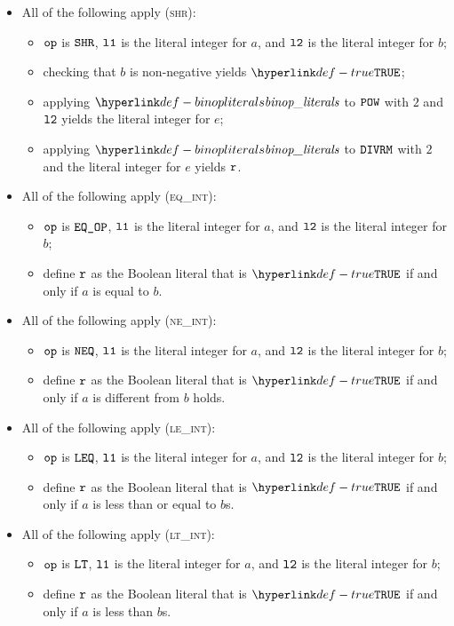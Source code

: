 \documentclass{book}
\newcommand\ProseOrTypeError[0]{\ProseTerminateAs{\TypeErrorConfig}}
\begin{document}
\begin{itemize}
  \item All of the following apply (\textsc{shr}):
  \begin{itemize}
    \item $\texttt{op}$ is $\texttt{SHR}$, $\texttt{l1}$ is the literal integer for $a$, and $\texttt{l2}$ is the literal integer for $b$;
    \item checking that $b$ is non-negative yields $\True$\ProseOrTypeError;
    \item applying $\binopliterals$ to $\texttt{POW}$ with $2$ and $\texttt{l2}$ yields the literal integer for $e$;
    \item applying $\binopliterals$ to $\texttt{DIVRM}$ with $2$ and the literal integer for $e$ yields $\texttt{r}$.
  \end{itemize}

  \item All of the following apply (\textsc{eq\_int}):
  \begin{itemize}
    \item $\texttt{op}$ is $\texttt{EQ\_OP}$, $\texttt{l1}$ is the literal integer for $a$, and $\texttt{l2}$ is the literal integer for $b$;
    \item define $\texttt{r}$ as the Boolean literal that is $\True$ if and only if $a$ is equal to $b$.
  \end{itemize}

  \item All of the following apply (\textsc{ne\_int}):
  \begin{itemize}
    \item $\texttt{op}$ is $\texttt{NEQ}$, $\texttt{l1}$ is the literal integer for $a$, and $\texttt{l2}$ is the literal integer for $b$;
    \item define $\texttt{r}$ as the Boolean literal that is $\True$ if and only if $a$ is different from $b$ holds.
  \end{itemize}

  \item All of the following apply (\textsc{le\_int}):
  \begin{itemize}
    \item $\texttt{op}$ is $\texttt{LEQ}$, $\texttt{l1}$ is the literal integer for $a$, and $\texttt{l2}$ is the literal integer for $b$;
    \item define $\texttt{r}$ as the Boolean literal that is $\True$ if and only if $a$ is less than or equal to $b$s.
  \end{itemize}

  \item All of the following apply (\textsc{lt\_int}):
  \begin{itemize}
    \item $\texttt{op}$ is $\texttt{LT}$, $\texttt{l1}$ is the literal integer for $a$, and $\texttt{l2}$ is the literal integer for $b$;
    \item define $\texttt{r}$ as the Boolean literal that is $\True$ if and only if $a$ is less than $b$s.
  \end{itemize}


\end{itemize}
\end{document}

